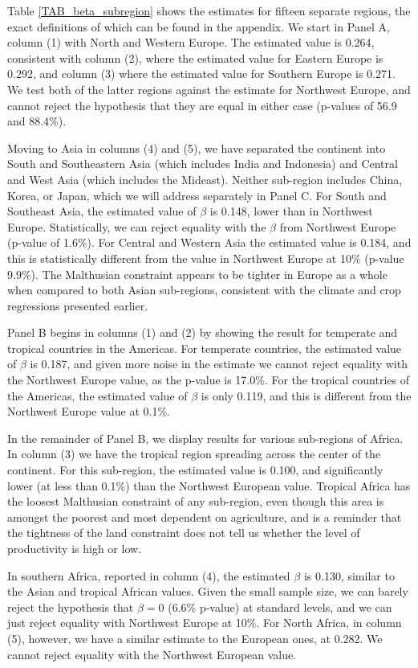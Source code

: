\documentclass[11pt]{article}
\begin{document}
Table \ref{TAB_beta_subregion} shows the estimates for fifteen separate regions, the exact definitions of which can be found in the appendix. We start in Panel A, column (1) with North and Western Europe. The estimated value is 0.264, consistent with column (2), where the estimated value for Eastern Europe is 0.292, and column (3) where the estimated value for Southern Europe is 0.271. We test both of the latter regions against the estimate for Northwest Europe, and cannot reject the hypothesis that they are equal in either case (p-values of 56.9 and 88.4\%). 

Moving to Asia in columns (4) and (5), we have separated the continent into South and Southeastern Asia (which includes India and Indonesia) and Central and West Asia (which includes the Mideast). Neither sub-region includes China, Korea, or Japan, which we will address separately in Panel C. For South and Southeast Asia, the estimated value of $\beta$ is 0.148, lower than in Northwest Europe. Statistically, we can reject equality with the $\beta$ from Northwest Europe (p-value of 1.6\%). For Central and Western Asia the estimated value is 0.184, and this is statistically different from the value in Northwest Europe at 10\% (p-value 9.9\%). The Malthusian constraint appears to be tighter in Europe as a whole when compared to both Asian sub-regions, consistent with the climate and crop regressions presented earlier.

Panel B begins in columns (1) and (2) by showing the result for temperate and tropical countries in the Americas. For temperate countries, the estimated value of $\beta$ is 0.187, and given more noise in the estimate we cannot reject equality with the Northwest Europe value, as the p-value is 17.0\%. For the tropical countries of the Americas, the estimated value of $\beta$ is only 0.119, and this is different from the Northwest Europe value at 0.1\%.

In the remainder of Panel B, we display results for various sub-regions of Africa. In column (3) we have the tropical region spreading across the center of the continent. For this sub-region, the estimated value is 0.100, and significantly lower (at less than 0.1\%) than the Northwest European value. Tropical Africa has the loosest Malthusian constraint of any sub-region, even though this area is amongst the poorest and most dependent on agriculture, and is a reminder that the tightness of the land constraint does not tell us whether the level of productivity is high or low.

In southern Africa, reported in column (4), the estimated $\beta$ is 0.130, similar to the Asian and tropical African values. Given the small sample size, we can barely reject the hypothesis that $\beta=0$ (6.6\% p-value) at standard levels, and we can just reject equality with Northwest Europe at 10\%. For North Africa, in column (5), however, we have a similar estimate to the European ones, at 0.282. We cannot reject equality with the Northwest European value.
\end{document}
